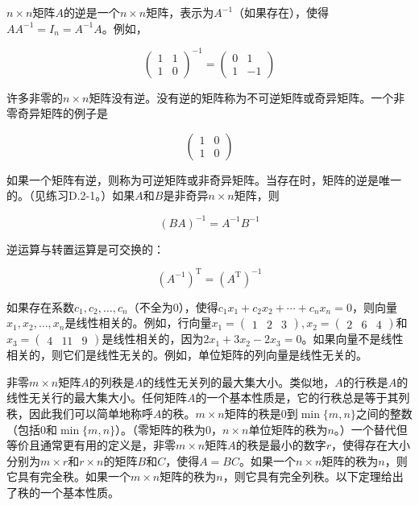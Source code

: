 \documentclass[lang=cn,newtx,10pt,scheme=chinese]{elegantbook}
\begin{document}
$n \times n$矩阵$A$的逆是一个$n \times n$矩阵，表示为$A^{-1}$（如果存在），使得$A A^{-1}=I_n=A^{-1} A$。例如，

$$
(\begin{array}{ll}
1 & 1 \\
1 & 0
\end{array})^{-1}=(\begin{array}{rr}
0 & 1 \\
1 & -1
\end{array})
$$

许多非零的$n \times n$矩阵没有逆。没有逆的矩阵称为不可逆矩阵或奇异矩阵。一个非零奇异矩阵的例子是

$$
(\begin{array}{ll}
1 & 0 \\
1 & 0
\end{array})
$$

如果一个矩阵有逆，则称为可逆矩阵或非奇异矩阵。当存在时，矩阵的逆是唯一的。（见练习D.2-1。）如果$A$和$B$是非奇异$n \times n$矩阵，则

$$
(B A)^{-1}=A^{-1} B^{-1}
$$

逆运算与转置运算是可交换的：

$$
(A^{-1})^{\mathrm{T}}=(A^{\mathrm{T}})^{-1}
$$

如果存在系数$c_1, c_2, \ldots, c_n$（不全为0），使得$c_1 x_1+c_2 x_2+\cdots+c_n x_n=0$，则向量$x_1, x_2, \ldots, x_n$是线性相关的。例如，行向量$x_1=(\begin{array}{lll}1 & 2 & 3\end{array}), x_2=(\begin{array}{lll}2 & 6 & 4\end{array})$和$x_3=(\begin{array}{lll}4 & 11 & 9\end{array})$是线性相关的，因为$2 x_1+3 x_2-2 x_3=0$。如果向量不是线性相关的，则它们是线性无关的。例如，单位矩阵的列向量是线性无关的。

非零$m \times n$矩阵$A$的列秩是$A$的线性无关列的最大集大小。类似地，$A$的行秩是$A$的线性无关行的最大集大小。任何矩阵$A$的一个基本性质是，它的行秩总是等于其列秩，因此我们可以简单地称呼$A$的秩。$m \times n$矩阵的秩是0到$\min\{m,n\}$之间的整数（包括0和$\min\{m,n\}$）。（零矩阵的秩为0，$n \times n$单位矩阵的秩为$n$。）一个替代但等价且通常更有用的定义是，非零$m \times n$矩阵$A$的秩是最小的数字$r$，使得存在大小分别为$m \times r$和$r \times n$的矩阵$B$和$C$，使得$A=BC$。如果一个$n \times n$矩阵的秩为$n$，则它具有完全秩。如果一个$m \times n$矩阵的秩为$n$，则它具有完全列秩。以下定理给出了秩的一个基本性质。
\end{document}
